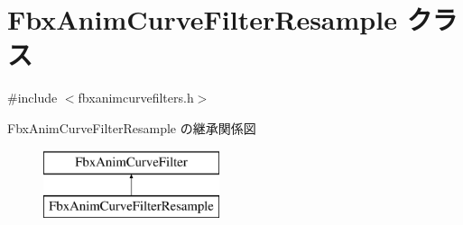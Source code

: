 \hypertarget{class_fbx_anim_curve_filter_resample}{}\section{Fbx\+Anim\+Curve\+Filter\+Resample クラス}
\label{class_fbx_anim_curve_filter_resample}


{\ttfamily \#include $<$fbxanimcurvefilters.\+h$>$}

Fbx\+Anim\+Curve\+Filter\+Resample の継承関係図\begin{figure}[H]
\begin{center}
\leavevmode
\includegraphics[height=2.000000cm]{class_fbx_anim_curve_filter_resample}
\end{center}
\end{figure}
